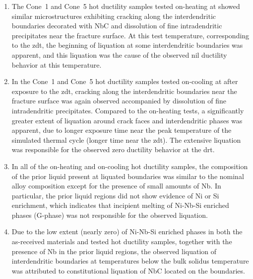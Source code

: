 \begin{enumerate}
\item The Cone~1 and Cone~5 hot ductility samples tested on-heating at  showed similar microstructures exhibiting cracking along the interdendritic boundaries decorated with NbC and dissolution of fine intradendritic precipitates near the fracture surface. At this test temperature, corresponding to the \gls{zdt}, the beginning of liquation at some interdendritic boundaries was apparent, and this liquation was the cause of the observed nil ductility behavior at this temperature.
\item In the Cone~1 and Cone~5 hot ductility samples tested on-cooling at  after exposure to the \gls{zdt}, cracking along the interdendritic boundaries near the fracture surface was again observed accompanied by dissolution of fine intradendritic precipitates. Compared to the on-heating tests, a significantly greater extent of liquation around crack faces and interdendritic phases was apparent, due to longer exposure time near the peak temperature of the simulated thermal cycle (longer time near the \gls{zdt}). The extensive liquation was responsible for the observed zero ductility behavior at the \gls{drt}.
\item In all of the on-heating and on-cooling hot ductility samples, the composition of the prior liquid present at liquated boundaries was similar to the nominal alloy composition except for the presence of small amounts of Nb. In particular, the prior liquid regions did not show evidence of Ni or Si enrichment, which indicates that incipient melting of Ni-Nb-Si enriched phases (G-phase) was not responsible for the observed liquation.
\item Due to the low extent (nearly zero) of Ni-Nb-Si enriched phases in both the as-received materials and tested hot ductility samples, together with the presence of Nb in the prior liquid regions, the observed liquation of interdendritic boundaries at temperatures below the bulk solidus temperature was attributed to constitutional liquation of NbC located on the boundaries.

\end{enumerate}


